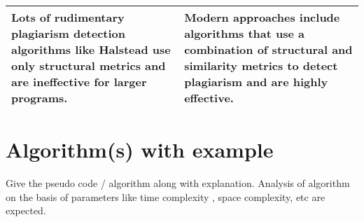 \begin{table}[h!]
\begin{tabular}{|p{6cm}|p{6cm}|}
			
			Lots of rudimentary plagiarism detection algorithms like Halstead use only structural metrics and are ineffective for larger programs. &  Modern approaches include algorithms that use a combination of structural and similarity metrics to detect plagiarism and are highly effective. \\ \hline 
			
			\end{tabular}
					
			
			
			\end{table}  
			
			
			
			
			
			
			
			
			
			
			
			
			
			
			
			
			
			
			
			
			
			\section{Algorithm(s) with example}
			
			Give the pseudo code / algorithm along with explanation. Analysis of algorithm on the basis of parameters like time complexity , space complexity, etc are expected. 